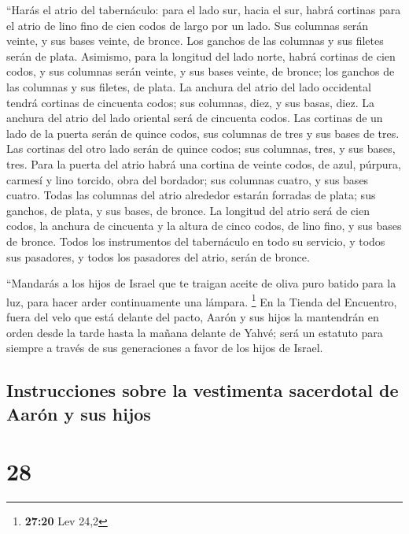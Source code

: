 ``Harás el atrio del tabernáculo: para el lado sur, hacia
el sur, habrá cortinas para el atrio de lino fino de cien codos de largo
por un lado.  Sus columnas serán veinte, y sus bases
veinte, de bronce. Los ganchos de las columnas y sus filetes serán de
plata.  Asimismo, para la longitud del lado norte, habrá
cortinas de cien codos, y sus columnas serán veinte, y sus bases veinte,
de bronce; los ganchos de las columnas y sus filetes, de plata.
 La anchura del atrio del lado occidental tendrá cortinas
de cincuenta codos; sus columnas, diez, y sus basas, diez.
 La anchura del atrio del lado oriental será de cincuenta
codos.  Las cortinas de un lado de la puerta serán de
quince codos, sus columnas de tres y sus bases de tres. 
Las cortinas del otro lado serán de quince codos; sus columnas, tres, y
sus bases, tres.  Para la puerta del atrio habrá una
cortina de veinte codos, de azul, púrpura, carmesí y lino torcido, obra
del bordador; sus columnas cuatro, y sus bases cuatro. 
Todas las columnas del atrio alrededor estarán forradas de plata; sus
ganchos, de plata, y sus bases, de bronce.  La longitud
del atrio será de cien codos, la anchura de cincuenta y la altura de
cinco codos, de lino fino, y sus bases de bronce.  Todos
los instrumentos del tabernáculo en todo su servicio, y todos sus
pasadores, y todos los pasadores del atrio, serán de bronce.

 ``Mandarás a los hijos de Israel que te traigan aceite
de oliva puro batido para la luz, para hacer arder continuamente una
lámpara. \footnote{\textbf{27:20} Lev 24,2}  En la Tienda
del Encuentro, fuera del velo que está delante del pacto, Aarón y sus
hijos la mantendrán en orden desde la tarde hasta la mañana delante de
Yahvé; será un estatuto para siempre a través de sus generaciones a
favor de los hijos de Israel.

\hypertarget{instrucciones-sobre-la-vestimenta-sacerdotal-de-aaruxf3n-y-sus-hijos}{%
\subsection{Instrucciones sobre la vestimenta sacerdotal de Aarón y sus
hijos}\label{instrucciones-sobre-la-vestimenta-sacerdotal-de-aaruxf3n-y-sus-hijos}}

\hypertarget{section-27}{%
\section{28}\label{section-27}}

